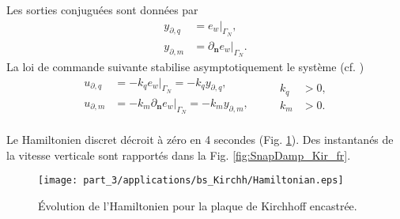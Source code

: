 Les sorties conjuguées sont données par
\begin{equation*}
\begin{aligned}
y_{\partial, q} &= e_w|_{\Gamma_N}, \\
y_{\partial, m} &=\partial_{\bm{n}} e_w|_{\Gamma_N}.
\end{aligned}
\end{equation*}
La loi de commande suivante stabilise asymptotiquement le système (cf. \cite{lagnese1989})
\begin{equation*}
\begin{aligned}
u_{\partial, q} &= - k_q e_w|_{\Gamma_N} = - k_q y_{\partial, q}, \\
u_{\partial, m} &= - k_m \partial_{\bm{n}} e_w|_{\Gamma_N}  = - k_m y_{\partial, m}, \\
\end{aligned} \qquad
\begin{aligned}
k_q&>0, \\
k_m&>0.
\end{aligned}
\end{equation*}

Le Hamiltonien discret décroit à zéro en 4 secondes (Fig. \ref{fig:H_bs_Kirchhoff_fr}). Des instantanés de la vitesse verticale sont rapportés dans la Fig. \ref{fig:SnapDamp_Kir_fr}.

\begin{figure}[htb]
	\centering
	\texttt{[image: part\_3/applications/bs\_Kirchh/Hamiltonian.eps]}
	\caption{Évolution de l'Hamiltonien pour la plaque de Kirchhoff encastrée.}
	\label{fig:H_bs_Kirchhoff_fr}
\end{figure}

\begin{figure*}[p]
	\centering
	\hfil
	\hfil
	\hfil
	\hfil
	\caption{Instantanés à différents moments de la simulation de la plaque de Kirchhoff contrôlée au bord.}
	\label{fig:SnapDamp_Kir_fr}
	\hfil
\end{figure*}

